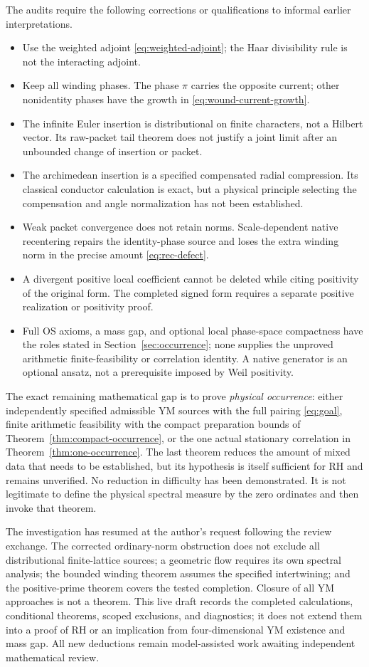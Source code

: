 The audits require the following corrections or
qualifications to informal earlier interpretations.
\begin{itemize}
\item Use the weighted adjoint
\eqref{eq:weighted-adjoint}; the Haar divisibility rule
is not the interacting adjoint.
\item Keep all winding phases. The phase $\pi$ carries
the opposite current; other nonidentity phases have
the growth in \eqref{eq:wound-current-growth}.
\item The infinite Euler insertion is distributional
on finite characters, not a Hilbert vector. Its
raw-packet tail theorem does not justify a joint limit
after an unbounded change of insertion or packet.
\item The archimedean insertion is a specified
compensated radial compression. Its classical
conductor calculation is exact, but a physical
principle selecting the compensation and angle
normalization has not been established.
\item Weak packet convergence does not retain norms.
Scale-dependent native recentering repairs the
identity-phase \Ltwo{} source and loses the extra winding
norm in the precise amount \eqref{eq:rec-defect}.
\item A divergent positive local coefficient cannot
be deleted while citing positivity of the original
form. The completed signed form requires a separate
positive realization or positivity proof.
\item Full OS axioms, a mass gap, and optional local
phase-space compactness have the roles stated in
Section~\ref{sec:occurrence}; none supplies the
unproved arithmetic finite-feasibility or correlation
identity. A native generator is an optional ansatz,
not a prerequisite imposed by Weil positivity.
\end{itemize}

The exact remaining mathematical gap is to prove
\emph{physical occurrence}: either independently
specified admissible YM sources with the full pairing
\eqref{eq:goal}, finite arithmetic feasibility with
the compact preparation bounds of
Theorem~\ref{thm:compact-occurrence}, or the one actual
stationary correlation in
Theorem~\ref{thm:one-occurrence}.
The last theorem reduces the amount of mixed data
that needs to be established, but its hypothesis is
itself sufficient for RH and remains unverified. No reduction in
difficulty has been demonstrated. It is not legitimate to
define the physical spectral measure by the zero
ordinates and then invoke that theorem.

The investigation has resumed at the author's request following the
review exchange. The corrected ordinary-norm obstruction does not
exclude all distributional finite-lattice sources; a geometric flow
requires its own spectral analysis; the bounded winding theorem assumes
the specified intertwining; and the positive-prime theorem covers the
tested completion. Closure of all YM approaches is not a theorem.
This live draft records the completed calculations,
conditional theorems, scoped exclusions, and diagnostics;
it does not extend them into a proof of RH or an
implication from four-dimensional YM existence and
mass gap. All new deductions remain model-assisted
work awaiting independent mathematical review.
